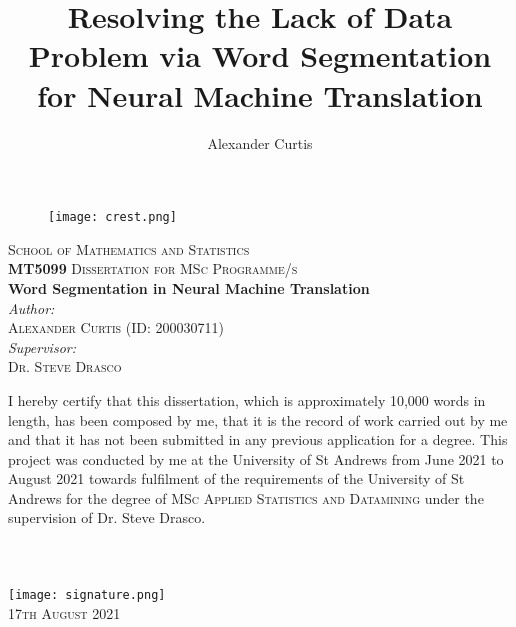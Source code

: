 \documentclass[11pt]{article}
\title{Resolving the Lack of Data Problem via Word Segmentation for Neural Machine Translation}
\author{Alexander Curtis}
\begin{document}
\begin{titlepage}
\begin{center}
    \begin{figure}[h]
    \centering
    \texttt{[image: crest.png]}
    \end{figure}
    \textsc{School of Mathematics and Statistics} \\
    \textsc{\textbf{MT5099} Dissertation for MSc Programme/s} \\
    \vspace{1cm}
    \huge{\textbf{Word Segmentation in Neural Machine Translation}} \\
    \vspace{1cm}
    \normalsize
    \textit{Author:} \\
    \textsc{Alexander Curtis (ID: 200030711)} \\
    \textit{Supervisor:} \\
    \textsc{Dr. Steve Drasco} \\
    \vspace{3cm}
    \end{center}
    I hereby certify that this dissertation, which is approximately 10,000 words in length, has been composed by me, that it is the record of work carried out by me and that it has not been submitted in any previous application for a degree. This project was conducted by me at the University of St Andrews from June 2021 to August 2021 towards fulfilment of the requirements of the University of St Andrews for the degree of \textsc{MSc Applied Statistics and Datamining} under the supervision of Dr. Steve Drasco. \\
    \\
    \\
    \\
    \vspace{1cm}
    \texttt{[image: signature.png]} \\
    \vspace{1cm}
    \textsc{17th August 2021}
\end{titlepage}


\newpage

\end{document}
